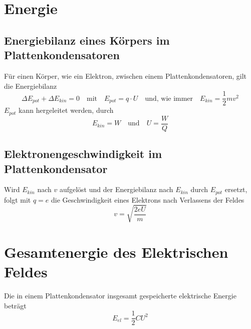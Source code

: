 \documentclass{article}
\begin{document}
 
\section{Energie} 
\subsection{Energiebilanz eines Körpers im Plattenkondensatoren}
Für einen Körper, wie ein Elektron, zwischen einem Plattenkondensatoren, gilt die Energiebilanz
\[
 \Delta E_{pot} + \Delta E_{kin} = 0
 \quad \text{mit} \quad
 E_{pot} = q \cdot U
 \quad \text{und, wie immer} \quad
 E_{kin} = \frac{1}{2} mv^2
\] 
$E_{pot}$ kann hergeleitet werden, durch 
\[
 E_{kin} = W
 \quad \text{und} \quad
 U = \frac{W}{Q} 
\] 
 
\subsection{Elektronengeschwindigkeit im Plattenkondensator} 
Wird $E_{kin}$ nach $v$ aufgelöst und der Energiebilanz nach $E_{kin}$ durch $E_{pot}$ ersetzt, folgt mit $q=e$ die Geschwindigkeit eines Elektrons nach Verlassens der Feldes
\[
 v = \sqrt{\frac{2 eU}{m}}
\] 
 
\section{Gesamtenergie des Elektrischen Feldes}
Die in einem Plattenkondensator insgesamt gespeicherte elektrische Energie beträgt
\[
 E_{el} = \frac{1}{2} CU^2 %
\] 
 
\end{document}
